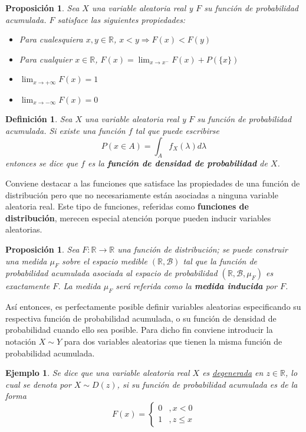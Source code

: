 \documentclass[12pt,letterpaper]{book}
\newtheorem{definicion}{Definición}[chapter]
\newtheorem{proposicion}[teorema]{Proposición}
\newtheorem{ejemplo}{Ejemplo}[chapter]
\newcommand{\R}{\mathbb{R}}
\begin{document}
\begin{proposicion}
Sea $X$ una variable aleatoria real y $F$ su función de probabilidad acumulada. $F$ satisface las siguientes propiedades:
\begin{itemize}
\item Para cualesquiera $x,y\in \R$, $x < y \Rightarrow F(x) < F(y)$
\item Para cualquier $x\in\R$, $F(x) = \lim_{x\rightarrow x^{-}} F(x) + P(\{x\})$
\item $\lim_{x\rightarrow +\infty} F(x) = 1$
\item $\lim_{x\rightarrow -\infty} F(x) = 0$
\end{itemize}
\end{proposicion}

\begin{definicion}
Sea $X$ una variable aleatoria real y $F$ su función de probabilidad acumulada. Si existe una función $f$  tal que puede escribirse
\begin{equation}
P(x\in A) = \int_A f_X(\lambda) d\lambda 
\end{equation}
entonces se dice que $f$ es la \textbf{función de densidad de probabilidad} de $X$.
\end{definicion}

Conviene destacar a las funciones que satisface las propiedades de una función de distribución pero que no necesariamente están asociadas a ninguna variable aleatoria real.
%
Este tipo de funciones, referidas como \textbf{funciones de distribución}, merecen especial atención porque pueden inducir variables aleatorias.

\begin{proposicion}
Sea $F:\R \rightarrow \R$ una función de distribución; se puede construir una medida $\mu_F$ sobre el espacio medible $(\R, \mathcal{B})$ tal que la función de probabilidad acumulada asociada al espacio de probabilidad $(\R, \mathcal{B}, \mu_F)$ es exactamente $F$.
%
La medida $\mu_F$ será referida como la \textbf{medida inducida} por $F$.
\end{proposicion}

Así entonces, es perfectamente posible definir variables aleatorias especificando su respectiva función de probabilidad acumulada, o su función de densidad de probabilidad cuando ello sea posible.
%
Para dicho fin conviene introducir la notación $X \sim Y$ para dos variables aleatorias que tienen la misma función de probabilidad acumulada.

\begin{ejemplo}
Se dice que una variable aleatoria real $X$ es \ul{degenerada} en $z\in \R$, lo cual se denota por $X\sim D(z)$, si su función de probabilidad acumulada es de la forma
\begin{equation}
F(x) = \begin{cases}
0 &, x < 0 \\
1 &, z \leq x
\end{cases}
\end{equation}
\end{ejemplo}
\end{document}
